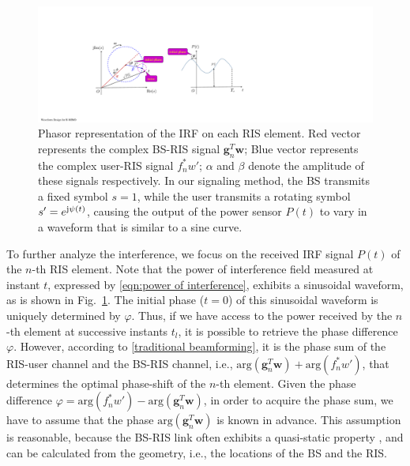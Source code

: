 \documentclass[conference,10pt,twocolumn]{IEEEtran}
\theoremstyle{nonumberplain}
\def \arg {\text{arg}}
\begin{document}
    \begin{figure}[!t]
        \centering
        \includegraphics[width=.45\textwidth]{figures/phasor.pdf}
        \caption{Phasor representation of the \ac{IRF} on each RIS element. Red vector represents the complex BS-RIS signal ${\bm g}_n^T{\bm w}$; Blue vector represents the complex user-RIS signal $f_n^*w'$; $\alpha$ and $\beta$ denote the amplitude of these signals respectively. In our signaling method, the BS transmits a fixed symbol $s=1$, while the user transmits a rotating symbol $s'=e^{{\rm j}\psi(t)}$, causing the output of the power sensor $P(t)$ to vary in a waveform that is similar to a sine curve.}
        \label{fig:phasor}
    \end{figure}
    To further analyze the interference, we focus on the received IRF signal $P(t)$ of the $n$-th RIS element. 
    Note that the power of interference field measured at instant $t$, expressed by \eqref{eqn:power of interference}, exhibits a sinusoidal waveform, as is shown in Fig.~\ref{fig:phasor}. 
    The initial phase ($t=0$) of this sinusoidal waveform is uniquely determined by $\varphi$.
    Thus, if we have access to the power received by the $n$-th element at successive instants $t_l$, it is possible to retrieve the phase difference $\varphi$. 
    However, according to \eqref{traditional beamforming}, it is the phase sum of the RIS-user channel and the BS-RIS channel, i.e., $\arg({\bm g}_n^{T}{\bm w})+\arg(f_n^*w')$, that determines the optimal phase-shift of the $n$-th element. Given the phase difference $\varphi = \arg\left(f_{n}^{*}w'\right)-\arg\left(\bm g_{n}^{T}\bm w\right)$, in order to acquire the phase sum, we have to assume that the phase $\arg({\bm g}_n^{T}{\bm w})$ is known in advance. 
    This assumption is reasonable, because the BS-RIS link often exhibits a quasi-static property \cite{Huchen}, and can be calculated from the geometry, i.e., the locations of the BS and the RIS. 
\end{document}
